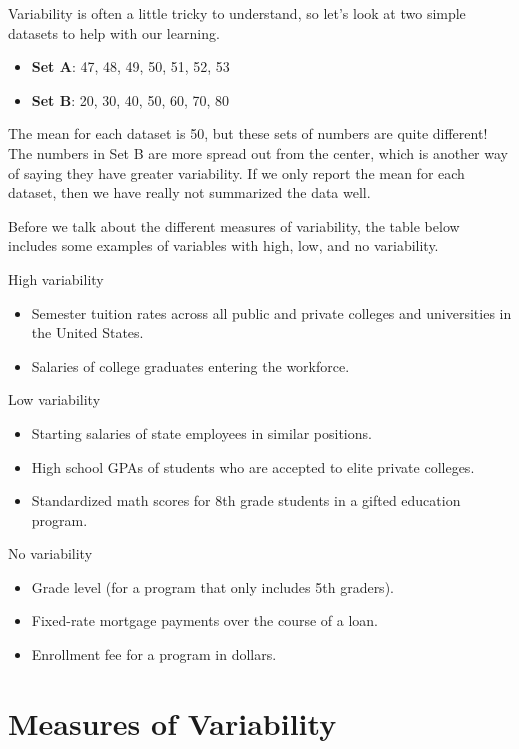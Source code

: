 \documentclass[
  letterpaper,
  DIV=11,
  numbers=noendperiod]{scrreprt}
\providecommand{\tightlist}{%
  \setlength{\itemsep}{0pt}\setlength{\parskip}{0pt}}
\begin{document}
Variability is often a little tricky to understand, so let's look at two
simple datasets to help with our learning.

\begin{itemize}
\item
  \textbf{Set A}: 47, 48, 49, 50, 51, 52, 53
\item
  \textbf{Set B}: 20, 30, 40, 50, 60, 70, 80
\end{itemize}

The mean for each dataset is 50, but these sets of numbers are quite
different! The numbers in Set B are more spread out from the center,
which is another way of saying they have greater variability. If we only
report the mean for each dataset, then we have really not summarized the
data well.

Before we talk about the different measures of variability, the table
below includes some examples of variables with high, low, and no
variability.

High variability

\begin{itemize}
\tightlist
\item
  Semester tuition rates across all public and private colleges and
  universities in the United States.
\item
  Salaries of college graduates entering the workforce.
\end{itemize}

Low variability

\begin{itemize}
\tightlist
\item
  Starting salaries of state employees in similar positions.
\item
  High school GPAs of students who are accepted to elite private
  colleges.
\item
  Standardized math scores for 8th grade students in a gifted education
  program.
\end{itemize}

No variability

\begin{itemize}
\tightlist
\item
  Grade level (for a program that only includes 5th graders).
\item
  Fixed-rate mortgage payments over the course of a loan.
\item
  Enrollment fee for a program in dollars.
\end{itemize}

\section{Measures of Variability}\label{measures-of-variability}
\end{document}

